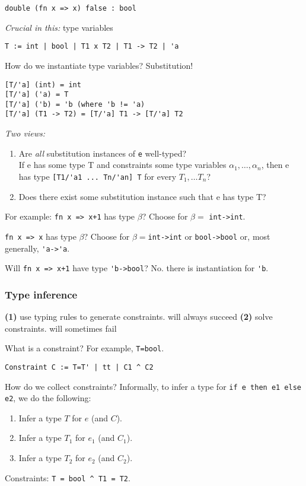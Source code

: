 \documentclass[11pt]{article}
\begin{document}
\begin{verbatim}
double (fn x => x) false : bool
\end{verbatim}

\emph{Crucial in this:} type variables
\begin{verbatim}
T := int | bool | T1 x T2 | T1 -> T2 | 'a
\end{verbatim}
How do we instantiate type variables? Substitution!
\begin{verbatim}
[T/'a] (int) = int
[T/'a] ('a) = T
[T/'a] ('b) = 'b (where 'b != 'a)
[T/'a] (T1 -> T2) = [T/'a] T1 -> [T/'a] T2
\end{verbatim}

\emph{Two views:}
\begin{enumerate}
    \item Are \emph{all} substitution instances of \verb~e~ well-typed? \\
        If e has some type T and constraints some type variables $\alpha_1, \ldots, \alpha_n$, then e has type \verb~[T1/'a1 ... Tn/'an] T~ for every $T_1, \ldots T_n$?
    \item Does there exist some substitution instance such that e has type T?
\end{enumerate}

For example: \verb~fn x => x+1~ has type $\beta$? Choose for $\beta =$ \verb~int->int~.

\verb~fn x => x~ has type $\beta$? Choose for $\beta=$\verb~int->int~ or \verb~bool->bool~ or, most generally, \verb~'a->'a~.

Will \verb~fn x => x+1~ have type \verb~'b->bool~? No. there is instantiation for \verb~'b~.

\subsubsection{Type inference}
\textbf{(1)} use typing rules to generate constraints. \textleftarrow will always succeed
\textbf{(2)} solve constraints. \textleftarrow will sometimes fail

What is a constraint? For example, \verb~T=bool~.

\begin{verbatim}
Constraint C := T=T' | tt | C1 ^ C2
\end{verbatim}

How do we collect constraints? Informally, to infer a type for \verb~if e then e1 else e2~, we do the following:
\begin{enumerate}
    \item Infer a type $T$ for $e$ (and $C$).
    \item Infer a type $T_1$ for $e_1$ (and $C_1$).
    \item Infer a type $T_2$ for $e_2$ (and $C_2$).
\end{enumerate}
Constraints: \verb~T = bool ^ T1 = T2~.
\end{document}
